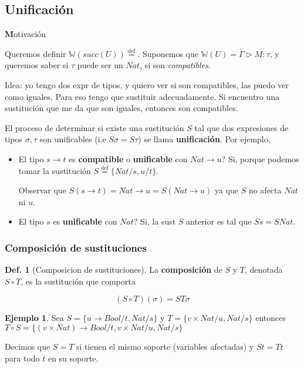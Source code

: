 \documentclass{report}
\theoremstyle{definition} %
\newtheorem{definition}{Def.}[chapter]
\newtheorem{example}{Ejemplo}[chapter]
\newenvironment{nota}[1]
    {\begin{leftbar}\textbf{#1}}
    {\end{leftbar}}
\newcommand{\eqdef}{\overset{\text{def}}{=}}
\newcommand{\tfunc}[2]{#1 \to #2}
\newcommand{\tipa}[3]{#1 \rhd #2 : #3} %
\newcommand{\Gtipa}[2]{\tipa{\Gamma}{#1}{#2}}
\newcommand{\suc}[1]{succ(#1)}
\newcommand{\tsust}[1]{S#1} %
\newcommand{\sustfor}[2]{#1/#2} %
\newcommand{\infer}[1]{\mathbb{W}(#1)}
\newcommand{\comp}[2]{#1 \circ #2}
\begin{document}
\subsection{Unificación}\label{sec:funcional:inferencia:unificacion}

\begin{nota}
    Motivación

    Queremos definir $\infer{\suc{U}} \eqdef$. Suponemos que $\infer{U} =
    \Gtipa{M}{\tau}$, y queremos saber si $\tau$ puede ser un $Nat$, si son
    \textit{compatibles}.
    
    Idea: yo tengo dos expr de tipos, y quiero ver si son compatibles, las puedo
    ver como iguales. Para eso tengo que sustituir adecuadamente. Si encuentro
    una sustitución que me da que son iguales, entonces son compatibles.
\end{nota}

El proceso de determinar si existe una sustitución $S$ tal que dos expresiones
de tipos $\sigma, \tau$ son unificables (i.e $\tsust{\sigma} =
\tsust{\tau}$) se llama \textbf{unificación}. Por ejemplo,

\begin{itemize}
    \item El tipo $\tfunc{s}{t}$ es \textbf{compatible} o \textbf{unificable}
    con $\tfunc{Nat}{u}$? Si, porque podemos tomar la sustitución $S \eqdef \{
    Nat / s, u / t \}$.

    Observar que
    \(
        \tsust{(\tfunc{s}{t})}
        = \tfunc{Nat}{u}
        = \tsust{(\tfunc{Nat}{u})}
    \)
    ya que $S$ no afecta $Nat$ ni $u$.

    \item El tipo $s$ es \textbf{unificable} con $Nat$? Si, la sust $S$ anterior
    es tal que $\tsust{s} = \tsust{Nat}$.
\end{itemize}

\subsubsection{Composición de sustituciones}
\label{sec:func:inferencia:unif:comp}

\begin{definition}[Composicion de sustituciones]
    La \textbf{composición} de $S$ y $T$, denotada $\comp{S}{T}$, es la sustitución que
    comporta

    \[
        (\comp{S}{T})(\sigma) = \tsust{T \sigma}
    \]

    \begin{example}
        Sea $S = \{ \sustfor{\tfunc{u}{Bool}}{t}, \sustfor{Nat}{s} \}$ y $T = \{
        \sustfor{v \times Nat}{u}, \sustfor{Nat}{s} \}$ entonces $\comp{T}{S} =
        \{ \sustfor{\tfunc{(v \times Nat)}{Bool}}{t}, \sustfor{v \times Nat}{u},
            \sustfor{Nat}{s}
        \}$
    \end{example}

    Decimos que $S = T$ si tienen el mismo soporte (variables afectadas) y $St =
    Tt$ para todo $t$ en su soporte.
\end{definition}
\end{document}
